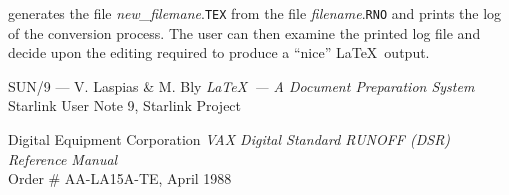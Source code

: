 generates the file {\it new\_filemane}.{\tt TEX} from the file {\it
filename}.{\tt RNO}  and prints the log of the conversion process.  The user
can then examine the printed log file and decide upon the editing required to
produce a ``nice'' \LaTeX\ output.

\begin{thebibliography}{99}


 SUN/9 --- V. Laspias \& M. Bly {\em \LaTeX\ --- A Document
Preparation  System} \\ Starlink User Note 9, Starlink Project


 Digital Equipment Corporation {\em VAX Digital Standard
RUNOFF (DSR) Reference Manual } \\ Order \# AA-LA15A-TE, April 1988

\end{thebibliography}


